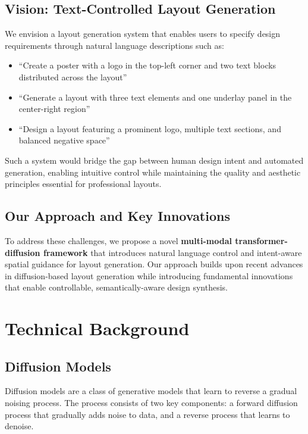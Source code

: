 \documentclass[journal,article,submit,pdftex,moreauthors]{Definitions/mdpi}
\begin{document}
\subsection{Vision: Text-Controlled Layout Generation}

We envision a layout generation system that enables users to specify design requirements through natural language descriptions such as:
\begin{itemize}
\item ``Create a poster with a logo in the top-left corner and two text blocks distributed across the layout''
\item ``Generate a layout with three text elements and one underlay panel in the center-right region''
\item ``Design a layout featuring a prominent logo, multiple text sections, and balanced negative space''
\end{itemize}

Such a system would bridge the gap between human design intent and automated generation, enabling intuitive control while maintaining the quality and aesthetic principles essential for professional layouts.

\subsection{Our Approach and Key Innovations}

To address these challenges, we propose a novel \textbf{multi-modal transformer-diffusion framework} that introduces natural language control and intent-aware spatial guidance for layout generation. Our approach builds upon recent advances in diffusion-based layout generation while introducing fundamental innovations that enable controllable, semantically-aware design synthesis. 

\section{Technical Background}

\subsection{Diffusion Models}

Diffusion models are a class of generative models that learn to reverse a gradual noising process. The process consists of two key components: a forward diffusion process that gradually adds noise to data, and a reverse process that learns to denoise.
\end{document}
